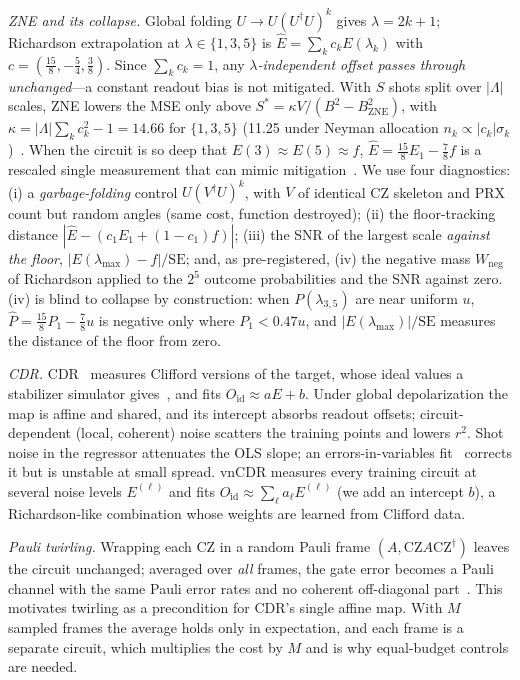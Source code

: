 \documentclass[conference]{IEEEtran}
\newcommand{\Oid}{O_{\mathrm{id}}}
\newcommand{\CZ}{\mathrm{CZ}}
\begin{document}
\emph{ZNE and its collapse.} Global folding $U\to U(U^\dagger U)^k$ gives $\lambda=2k+1$;
Richardson extrapolation at $\lambda\in\{1,3,5\}$ is $\hat E=\sum_kc_kE(\lambda_k)$ with
$c=(\tfrac{15}{8},-\tfrac54,\tfrac38)$. Since $\sum_kc_k=1$, any \emph{$\lambda$-independent
offset passes through unchanged}---a constant readout bias is not mitigated. With $S$ shots
split over $|\Lambda|$ scales, ZNE lowers the MSE only above
$S^\ast=\kappa V/(B^2-B_{\text{ZNE}}^2)$, with $\kappa=|\Lambda|\sum_kc_k^2-1=14.66$ for
$\{1,3,5\}$ (11.25 under Neyman allocation $n_k\propto|c_k|\sigma_k$)~\cite{krebsbach2022}.
When the circuit is so deep that $E(3)\approx E(5)\approx f$, $\hat E=\tfrac{15}{8}E_1-\tfrac78f$
is a rescaled single measurement that can mimic mitigation~\cite{koster2026}. We use four
diagnostics: (i) a \emph{garbage-folding} control $U(V^\dagger U)^k$, with $V$ of identical CZ
skeleton and PRX count but random angles (same cost, function destroyed); (ii) the
floor-tracking distance $|\hat E-(c_1E_1+(1-c_1)f)|$; (iii) the SNR of the largest scale
\emph{against the floor}, $|E(\lambda_{\max})-f|/\mathrm{SE}$; and, as pre-registered, (iv) the
negative mass $W_{\text{neg}}$ of Richardson applied to the $2^5$ outcome probabilities and
the SNR against zero. (iv) is blind to collapse by construction: when $P(\lambda_{3,5})$ are
near uniform $u$, $\hat P=\tfrac{15}{8}P_1-\tfrac78u$ is negative only where $P_1<0.47u$, and
$|E(\lambda_{\max})|/\mathrm{SE}$ measures the distance of the floor from zero.

\emph{CDR.} CDR~\cite{czarnik2021,lowe2021} measures Clifford versions of the target, whose
ideal values a stabilizer simulator gives~\cite{gottesman1998,aaronson2004}, and fits
$\Oid\approx aE+b$. Under global depolarization the map is affine and shared, and its
intercept absorbs readout offsets; circuit-dependent (local, coherent) noise scatters the
training points and lowers $r^2$. Shot noise in the regressor attenuates the OLS slope; an
errors-in-variables fit~\cite{fuller1987} corrects it but is unstable at small spread. vnCDR
\cite{lowe2021} measures every training circuit at several noise levels $E^{(\ell)}$ and fits
$\Oid\approx\sum_\ell a_\ell E^{(\ell)}$ (we add an intercept $b$), a Richardson-like
combination whose weights are learned from Clifford data.

\emph{Pauli twirling.} Wrapping each CZ in a random Pauli frame $(A,\CZ A\CZ^\dagger)$ leaves
the circuit unchanged; averaged over \emph{all} frames, the gate error becomes a Pauli channel
with the same Pauli error rates and no coherent off-diagonal part~\cite{wallman2016,hashim2021}.
This motivates twirling as a precondition for CDR's single affine map. With $M$ sampled frames
the average holds only in expectation, and each frame is a separate circuit, which multiplies
the cost by $M$ and is why equal-budget controls are needed.
\end{document}
